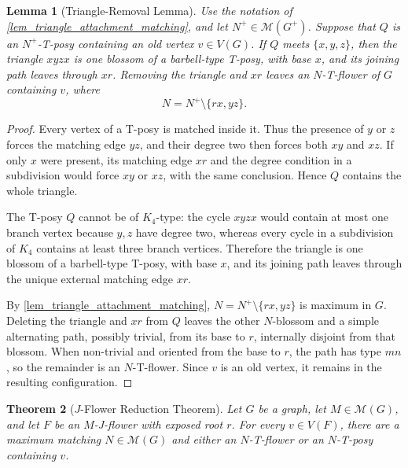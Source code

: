 \documentclass[preprint,12pt]{elsarticle}
\theoremstyle{plain}
\newtheorem{theorem}{Theorem}[section]
\newtheorem{lemma}[theorem]{Lemma}
\begin{document}
\begin{lemma}[Triangle-Removal Lemma]\label{lem_triangle_removal}
Use the notation of \cref{lem_triangle_attachment_matching}, and let
\(N^+\in\mathcal M(G^+)\). Suppose that \(Q\) is an
\(N^+\)-T-posy containing an old vertex \(v\in V(G)\). If \(Q\) meets
\(\{x,y,z\}\), then the triangle \(xyzx\) is one blossom of a barbell-type
T-posy, with base \(x\), and its joining path leaves through \(xr\). Removing
the triangle and \(xr\) leaves an \(N\)-T-flower of \(G\) containing \(v\),
where
\[
N=N^+\setminus\{rx,yz\}.
\]
\end{lemma}

\begin{proof}
Every vertex of a T-posy is matched inside it. Thus the presence of \(y\) or
\(z\) forces the matching edge \(yz\), and their degree two then forces both
\(xy\) and \(xz\). If only \(x\) were present, its matching edge \(xr\) and
the degree condition in a subdivision would force \(xy\) or \(xz\), with the
same conclusion. Hence \(Q\) contains the whole triangle.

The T-posy \(Q\) cannot be of \(K_4\)-type: the cycle \(xyzx\) would contain
at most one branch vertex because \(y,z\) have degree two, whereas every
cycle in a subdivision of \(K_4\) contains at least three branch vertices.
Therefore the triangle is one blossom of a barbell-type T-posy, with base
\(x\), and its joining path leaves through the unique external matching edge
\(xr\).

By \cref{lem_triangle_attachment_matching},
\(N=N^+\setminus\{rx,yz\}\) is maximum in \(G\). Deleting the triangle and
\(xr\) from \(Q\) leaves the other \(N\)-blossom and a simple alternating
path, possibly trivial, from its base to \(r\), internally disjoint from that
blossom. When non-trivial and oriented from the base to \(r\), the path has
type \(mn\), so the remainder is an \(N\)-T-flower. Since \(v\) is an old
vertex, it remains in the resulting configuration.
\end{proof}

\begin{theorem}[\(J\)-Flower Reduction Theorem]\label{thm_marked_jflower}
Let \(G\) be a graph, let \(M\in\mathcal M(G)\), and let \(F\) be an
\(M\)-J-flower with exposed root \(r\). For every \(v\in V(F)\), there are
a maximum matching \(N\in\mathcal M(G)\) and either an \(N\)-T-flower or an
\(N\)-T-posy containing \(v\).
\end{theorem}
\end{document}
